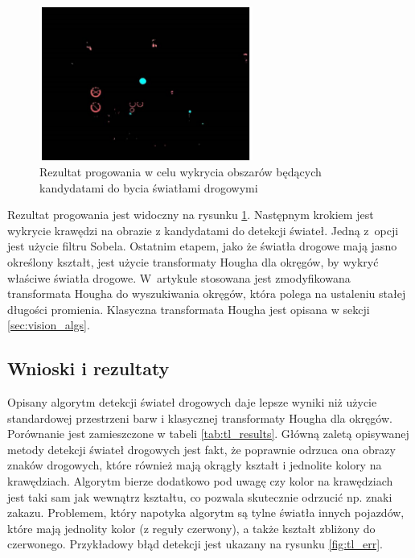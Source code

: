 \begin{figure}
  \centering
  \includegraphics[width=7cm]{img/tl_thresh.png}
  \caption{Rezultat progowania w celu wykrycia obszarów będących kandydatami do bycia światłami drogowymi\cite{T4}}
  \label{fig:tl_thresh}
\end{figure}

Rezultat progowania jest widoczny na rysunku \ref{fig:tl_thresh}. 
Następnym krokiem jest wykrycie krawędzi na obrazie z kandydatami do detekcji świateł. 
Jedną z~opcji jest użycie filtru Sobela. 
Ostatnim etapem, jako że światła drogowe mają jasno określony kształt, jest użycie transformaty Hougha dla okręgów, by wykryć właściwe światła drogowe. 
W~artykule stosowana jest zmodyfikowana transformata Hougha do wyszukiwania okręgów, która polega na ustaleniu stałej długości promienia. 
Klasyczna transformata Hougha jest opisana w sekcji \ref{sec:vision_algs}. %

\subsection{Wnioski i rezultaty} %

Opisany algorytm detekcji świateł drogowych daje lepsze wyniki niż użycie standardowej przestrzeni barw i klasycznej transformaty Hougha dla okręgów. 
Porównanie jest zamieszczone w tabeli \ref{tab:tl_results}. 
Główną zaletą opisywanej metody detekcji świateł drogowych jest fakt, że poprawnie odrzuca ona obrazy znaków drogowych, które również mają okrągły kształt i jednolite kolory na krawędziach. %
Algorytm bierze dodatkowo pod uwagę czy kolor na krawędziach jest taki sam jak wewnątrz kształtu, co pozwala skutecznie odrzucić np. znaki zakazu. %
Problemem, który napotyka algorytm są tylne światła innych pojazdów, które mają jednolity kolor (z reguły czerwony), a także kształt zbliżony do czerwonego. %
Przykładowy błąd detekcji jest ukazany na rysunku \ref{fig:tl_err}.

